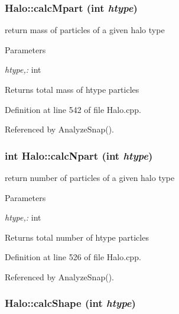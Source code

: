 \subsubsection[{calcMpart}]{ Halo::calcMpart (int {\em htype})}\label{classHalo_a24bcfddbfc2697c470c3b38c0c7fb80a}


return mass of particles of a given halo type 


\begin{DoxyParams}{Parameters}
\item[{\em htype,:}]int \end{DoxyParams}
\begin{DoxyReturn}{Returns}
total mass of htype particles 
\end{DoxyReturn}


Definition at line 542 of file Halo.cpp.



Referenced by AnalyzeSnap().

\subsubsection[{calcNpart}]{\setlength{\rightskip}{0pt plus 5cm}int Halo::calcNpart (int {\em htype})}\label{classHalo_a5d30d6d529d114af2c3a1710d95e6014}


return number of particles of a given halo type 


\begin{DoxyParams}{Parameters}
\item[{\em htype,:}]int \end{DoxyParams}
\begin{DoxyReturn}{Returns}
total number of htype particles 
\end{DoxyReturn}


Definition at line 526 of file Halo.cpp.



Referenced by AnalyzeSnap().

\subsubsection[{calcShape}]{ Halo::calcShape (int {\em htype})}\label{classHalo_a14c7d35c10f92e4635365cf6ce20248c}


